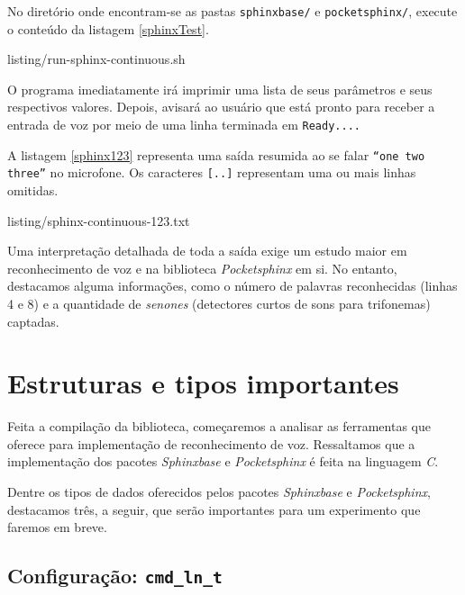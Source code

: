 No diretório onde encontram-se as pastas \texttt{sphinxbase/} e \texttt{pocketsphinx/}, execute o conteúdo da listagem \ref{sphinxTest}.


  {listing/run-sphinx-continuous.sh}

O programa imediatamente irá imprimir uma lista de seus parâmetros e seus respectivos valores. Depois, avisará ao usuário que está pronto para receber a entrada de voz por meio de uma linha terminada em \texttt{Ready....}

A listagem \ref{sphinx123} representa uma saída resumida ao se falar \texttt{``one two three''} no microfone. Os caracteres \texttt{[..]} representam uma ou mais linhas omitidas.


  {listing/sphinx-continuous-123.txt}

Uma interpretação detalhada de toda a saída exige um estudo maior em reconhecimento de voz e na biblioteca \textit{Pocketsphinx} em si. No entanto, destacamos alguma informações, como o número de palavras reconhecidas (linhas 4 e 8) e a quantidade de \textit{senones} (detectores curtos de sons para trifonemas) captadas.


\section{Estruturas e tipos importantes}

Feita a compilação da biblioteca, começaremos a analisar as ferramentas que oferece para implementação de reconhecimento de voz. Ressaltamos que a implementação dos pacotes \textit{Sphinxbase} e \textit{Pocketsphinx} é feita na linguagem \textit{C}.

Dentre os tipos de dados oferecidos pelos pacotes \textit{Sphinxbase} e \textit{Pocketsphinx}, destacamos três, a seguir, que serão importantes para um experimento que faremos em breve.


\subsection{Configuração: \texttt{cmd\_ln\_t}}

